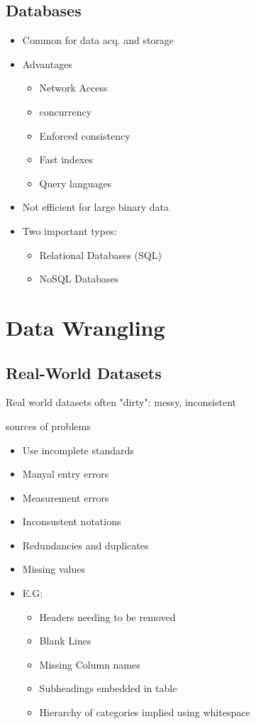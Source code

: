 \documentclass[a4paper]{article}
\begin{document}
\subsection{Databases}
\begin{itemize}
	\item Common for data acq. and storage
	\item Advantages
	\begin{itemize}
		\item Network Access
		\item concurrency
		\item Enforced consistency
		\item Fast indexes
		\item Query languages
	\end{itemize}
	\item Not efficient for large binary data
	\item Two important types:
	\begin{itemize}
		\item Relational Databases (SQL)
		\item NoSQL Databases
	\end{itemize}
\end{itemize}
\section{Data Wrangling}
\subsection{Real-World Datasets}
Real world datasets often "dirty": messy, inconsistent
\par sources of problems
\begin{itemize}
	\item Use incomplete standards
	\item Manyal entry errors
	\item Measurement errors
	\item Inconsustent notations
	\item Redundancies and duplicates
	\item Missing values
	\item E.G:
	\begin{itemize}
		\item Headers needing to be removed
		\item Blank Lines
		\item Missing Column names
		\item Subheadings embedded in table
		\item Hierarchy of categories implied using whitespace
	\end{itemize}
\end{itemize}
\end{document}
